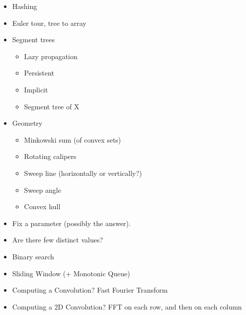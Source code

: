 \documentclass[8pt,a4paper,landscape,oneside]{amsart}
\newenvironment{myitemize}
{ \begin{itemize}[leftmargin=.5cm]
    \setlength{\itemsep}{0pt}
    \setlength{\parskip}{0pt}
    \setlength{\parsep}{0pt}     }
{ \end{itemize}                  }
\begin{document}
\begin{multicols*}{3}
\begin{myitemize}
                    \begin{itemize}
                        \item Trie (maybe over something weird, like bits)
                        \item Suffix array
                        \item Suffix automaton (+DP?)
                        \item Aho-Corasick
                        \item eerTree
                        \item Work with $S+S$
                    \end{itemize}
                \item Hashing
                \item Euler tour, tree to array
                \item Segment trees
                    \begin{itemize}
                        \item Lazy propagation
                        \item Persistent
                        \item Implicit
                        \item Segment tree of X
                    \end{itemize}
                \item Geometry
                    \begin{itemize}
                        \item Minkowski sum (of convex sets)
                        \item Rotating calipers
                        \item Sweep line (horizontally or vertically?)
                        \item Sweep angle
                        \item Convex hull
                    \end{itemize}
                \item Fix a parameter (possibly the answer).
                \item Are there few distinct values?
                \item Binary search
                \item Sliding Window (+ Monotonic Queue)
                \item Computing a Convolution? Fast Fourier Transform
                \item Computing a 2D Convolution? FFT on each row, and then on each column

\end{myitemize}
\end{multicols*}
\end{document}
